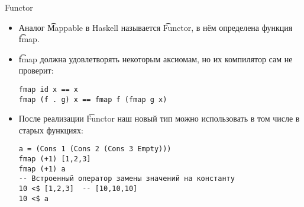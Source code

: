 \begin{frame}[fragile]{Functor}
	\begin{itemize}
		\item Аналог \t{Mappable} в Haskell называется \t{Functor}, в нём определена функция \t{fmap}.
		\item \t{fmap} должна удовлетворять некоторым аксиомам, но их компилятор сам не проверит:
\begin{verbatim}
fmap id x == x
fmap (f . g) x == fmap f (fmap g x)
\end{verbatim}
		\item После реализации \t{Functor} наш новый тип можно использовать в том числе в старых функциях:
\begin{verbatim}
a = (Cons 1 (Cons 2 (Cons 3 Empty)))
fmap (+1) [1,2,3]
fmap (+1) a
-- Встроенный оператор замены значений на константу
10 <$ [1,2,3]  -- [10,10,10]
10 <$ a
\end{verbatim}
	\end{itemize}
\end{frame}

